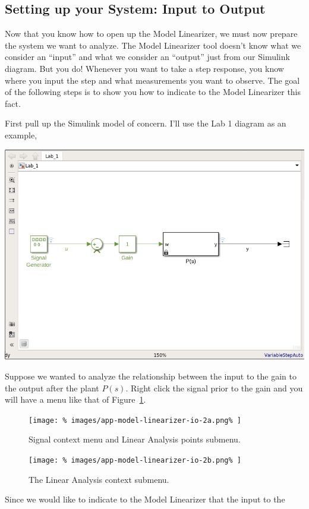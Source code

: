 \subsection{Setting up your System: Input to Output}
\label{App:Simulink:ModelLinearizer:2}
Now that you know how to open up the Model Linearizer, we must now prepare
the system we want to analyze. The Model Linearizer tool doesn't know what
we consider an ``input'' and what we consider an ``output'' just from our
Simulink diagram. But you do! Whenever you want to take a step response, you
know where you input the step and what measurements you want to observe.
The goal of the following steps is to show you how to indicate to the
Model Linearizer this fact.

First pull up the Simulink model of concern. I'll use the Lab 1 diagram as
an example,
%
\begin{center}
  \includegraphics[width=0.8\linewidth]{images/app-model-linearizer-io-1.png}
\end{center}
%
Suppose we wanted to analyze the relationship between the input to the gain
to the output after the plant \(P(s).\) Right click the signal prior to the
gain and you will have a menu like that of Figure~\ref{fig:app1:io-menu:a}.
%
\begin{figure}
  \centering
  \texttt{[image: \%
    images/app-model-linearizer-io-2a.png\%
  ]}
  \caption{Signal context menu and Linear Analysis points submenu.}
  \label{fig:app1:io-menu:a}
\end{figure}
%
\begin{figure}
  \centering
  \texttt{[image: \%
    images/app-model-linearizer-io-2b.png\%
  ]}
  \caption{The Linear Analysis context submenu.}
  \label{fig:app1:io-menu:b}
\end{figure}
%
Since we would like to indicate to the Model Linearizer that the input to the
